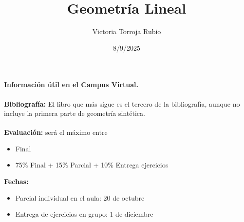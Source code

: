 \documentclass{report}
\begin{document}
\title{Geometría Lineal}
\author{Victoria Torroja Rubio}
\date{8/9/2025}

\maketitle

\tableofcontents

\pagebreak

\textbf{Información útil en el Campus Virtual.} \\ \\
\textbf{Bibliografía:} El libro que más sigue es el tercero de la bibliografía, aunque no incluye la primera parte de geometría sintética. \\ \\
\textbf{Evaluación:} será el máximo entre
\begin{itemize}
\item Final
\item 75\% Final + 15\% Parcial + 10\% Entrega ejercicios
\end{itemize}
\textbf{Fechas:} 
\begin{itemize}
\item Parcial individual en el aula: 20 de octubre
\item Entrega de ejercicios en grupo: 1 de diciembre
\end{itemize}



\end{document}
